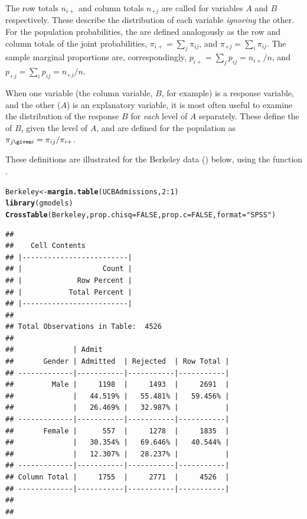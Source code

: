 \documentclass[11pt]{book}\usepackage[]{graphicx}\usepackage[]{color}
\makeatletter
\newcommand{\hlnum}[1]{\textcolor[rgb]{0.686,0.059,0.569}{#1}}%
\newcommand{\hlstr}[1]{\textcolor[rgb]{0.192,0.494,0.8}{#1}}%
\newcommand{\hlopt}[1]{\textcolor[rgb]{0,0,0}{#1}}%
\newcommand{\hlstd}[1]{\textcolor[rgb]{0.345,0.345,0.345}{#1}}%
\newcommand{\hlkwb}[1]{\textcolor[rgb]{0.69,0.353,0.396}{#1}}%
\newcommand{\hlkwc}[1]{\textcolor[rgb]{0.333,0.667,0.333}{#1}}%
\newcommand{\hlkwd}[1]{\textcolor[rgb]{0.737,0.353,0.396}{\textbf{#1}}}%
\newenvironment{kframe}{%
 \def\at@end@of@kframe{}%
 \ifinner\ifhmode%
  \def\at@end@of@kframe{\end{minipage}}%
  \begin{minipage}{\columnwidth}%
 \fi\fi%
 \def\FrameCommand##1{\hskip\@totalleftmargin \hskip-\fboxsep
 \colorbox{shadecolor}{##1}\hskip-\fboxsep
     \hskip-\linewidth \hskip-\@totalleftmargin \hskip\columnwidth}%
 \MakeFramed {\advance\hsize-\width
   \@totalleftmargin\z@ \linewidth\hsize
   \@setminipage}}%
 {\par\unskip\endMakeFramed%
 \at@end@of@kframe}
\newenvironment{knitrout}{}{} %
\renewenvironment{knitrout}{\small\renewcommand{\baselinestretch}{.85}}{} %
\makeatother
\begin{document}
The row totals $n_{i+}$ and column totals $n_{+j}$ are called 
 for variables $A$ and $B$ respectively.
These describe the distribution of each variable \emph{ignoring} the other.
For the population probabilities, the 
are defined analogously as the row and column totals of the 
joint probabilities,
$\pi_{i+} = \sum_j \pi_{ij}$, and
$\pi_{+j} = \sum_i \pi_{ij}$.
The sample marginal proportions are, correspondingly, 
$p_{i+} = \sum_j p_{ij} = n_{i+} / n$, and 
$p_{+j} = \sum_i p_{ij} = n_{+j} / n$.

When one variable (the column variable, $B$, for example) is a response
variable, and the other ($A$) is an explanatory variable,
it is most often useful to examine the distribution of the response $B$
for \emph{each} level of $A$ separately.
These define the  of $B$, given the
level of $A$, and are defined for the population as
$\pi_{j\given i} = \pi_{ij} / \pi_{i+}$.

These definitions are illustrated
for the Berkeley data () below,
using the function .
\begin{knitrout}
\color{fgcolor}\begin{kframe}
\begin{alltt}
\hlstd{Berkeley} \hlkwb{<-} \hlkwd{margin.table}\hlstd{(UCBAdmissions,} \hlnum{2}\hlopt{:}\hlnum{1}\hlstd{)}
\hlkwd{library}\hlstd{(gmodels)}
\hlkwd{CrossTable}\hlstd{(Berkeley,} \hlkwc{prop.chisq}\hlstd{=}\hlnum{FALSE}\hlstd{,} \hlkwc{prop.c}\hlstd{=}\hlnum{FALSE}\hlstd{,} \hlkwc{format}\hlstd{=}\hlstr{"SPSS"}\hlstd{)}
\end{alltt}
\begin{verbatim}
## 
##    Cell Contents
## |-------------------------|
## |                   Count |
## |             Row Percent |
## |           Total Percent |
## |-------------------------|
## 
## Total Observations in Table:  4526 
## 
##              | Admit 
##       Gender | Admitted  | Rejected  | Row Total | 
## -------------|-----------|-----------|-----------|
##         Male |     1198  |     1493  |     2691  | 
##              |   44.519% |   55.481% |   59.456% | 
##              |   26.469% |   32.987% |           | 
## -------------|-----------|-----------|-----------|
##       Female |      557  |     1278  |     1835  | 
##              |   30.354% |   69.646% |   40.544% | 
##              |   12.307% |   28.237% |           | 
## -------------|-----------|-----------|-----------|
## Column Total |     1755  |     2771  |     4526  | 
## -------------|-----------|-----------|-----------|
## 
## 
\end{verbatim}
\end{kframe}
\end{knitrout}
\end{document}
